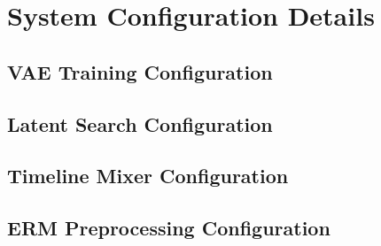\chapter{System Configuration Details}
\label{app:system-config}

\section{VAE Training Configuration}


\section{Latent Search Configuration}


\section{Timeline Mixer Configuration}


\section{ERM Preprocessing Configuration}

